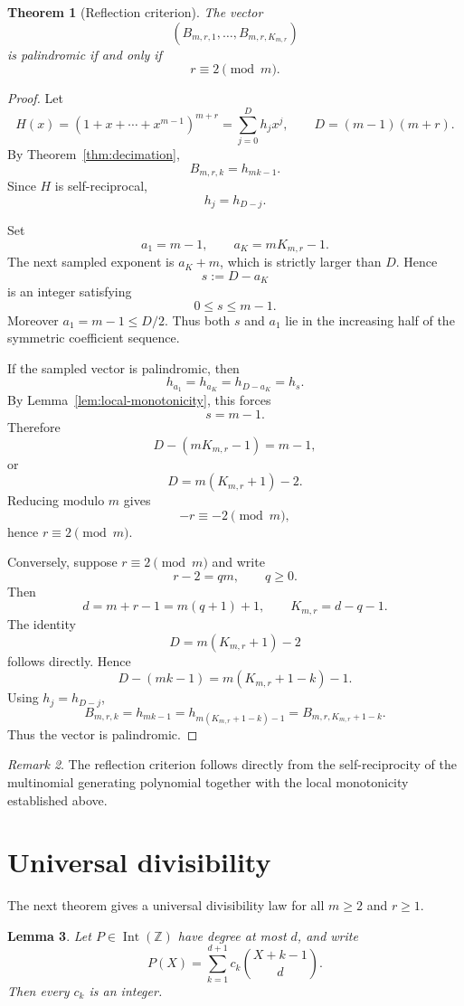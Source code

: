 \documentclass[11pt]{article}
\newtheorem{theorem}{Theorem}[section]
\newtheorem{lemma}[theorem]{Lemma}
\theoremstyle{definition}
\theoremstyle{remark}
\newtheorem{remark}[theorem]{Remark}
\newcommand{\Z}{\mathbb Z}
\newcommand{\Int}{\operatorname{Int}}
\begin{document}
\begin{theorem}[Reflection criterion]
\label{thm:symmetry}
The vector
\[
 (B_{m,r,1},\ldots,B_{m,r,K_{m,r}})
\]
is palindromic if and only if
\[
 r\equiv2\pmod m.
\]
\end{theorem}

\begin{proof}
Let
\[
 H(x)=(1+x+\cdots+x^{m-1})^{m+r}
     =\sum_{j=0}^{D}h_jx^j,
 \qquad D=(m-1)(m+r).
\]
By Theorem~\ref{thm:decimation},
\[
 B_{m,r,k}=h_{mk-1}.
\]
Since $H$ is self-reciprocal,
\[
 h_j=h_{D-j}.
\]

Set
\[
 a_1=m-1,\qquad a_K=mK_{m,r}-1.
\]
The next sampled exponent is $a_K+m$, which is strictly larger than $D$.
Hence
\[
 s:=D-a_K
\]
is an integer satisfying
\[
 0\le s\le m-1.
\]
Moreover $a_1=m-1\le D/2$. Thus both $s$ and $a_1$ lie in the increasing
half of the symmetric coefficient sequence.

If the sampled vector is palindromic, then
\[
 h_{a_1}=h_{a_K}=h_{D-a_K}=h_s.
\]
By Lemma~\ref{lem:local-monotonicity}, this forces
\[
 s=m-1.
\]
Therefore
\[
 D-(mK_{m,r}-1)=m-1,
\]
or
\[
 D=m(K_{m,r}+1)-2.
\]
Reducing modulo $m$ gives
\[
 -r\equiv-2\pmod m,
\]
hence $r\equiv2\pmod m$.

Conversely, suppose $r\equiv2\pmod m$ and write
\[
 r-2=qm,\qquad q\ge0.
\]
Then
\[
 d=m+r-1=m(q+1)+1,
 \qquad
 K_{m,r}=d-q-1.
\]
The identity
\[
 D=m(K_{m,r}+1)-2
\]
follows directly. Hence
\[
 D-(mk-1)=m(K_{m,r}+1-k)-1.
\]
Using $h_j=h_{D-j}$,
\[
 B_{m,r,k}
 =h_{mk-1}
 =h_{m(K_{m,r}+1-k)-1}
 =B_{m,r,K_{m,r}+1-k}.
\]
Thus the vector is palindromic.
\end{proof}

\begin{remark}
The reflection criterion follows directly from the self-reciprocity of the
multinomial generating polynomial together with the local monotonicity
established above.
\end{remark}

\section{Universal divisibility}
\label{sec:divisibility}

The next theorem gives a universal divisibility law for all $m\ge2$ and
$r\ge1$.

\begin{lemma}
\label{lem:intz}
Let $P\in\Int(\Z)$ have degree at most $d$, and write
\[
 P(X)=\sum_{k=1}^{d+1}c_k\binom{X+k-1}{d}.
\]
Then every $c_k$ is an integer.
\end{lemma}
\end{document}
